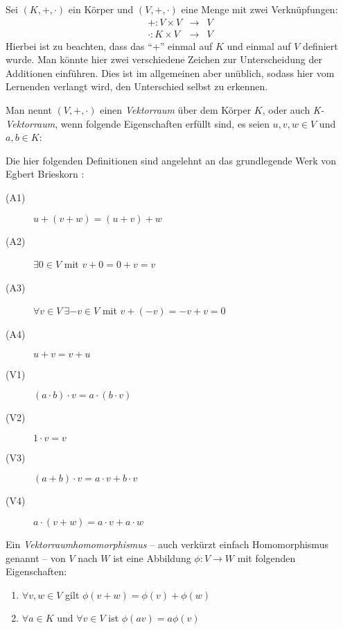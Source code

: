 Sei $(K,+,\cdot )$ ein Körper und $(V,+ ,\cdot)$ eine Menge mit zwei Verknüpfungen:
\begin{eqnarray*}
+ : V\times V &\longrightarrow& V \\
\cdot : K \times V &\longrightarrow& V 
\end{eqnarray*}
Hierbei ist zu beachten, dass das "`+"' einmal auf $K$ und einmal auf $V$ definiert wurde. Man könnte hier zwei verschiedene Zeichen zur Unterscheidung der Additionen einführen. Dies ist im allgemeinen aber unüblich, sodass hier vom Lernenden verlangt wird, den Unterschied selbst zu erkennen. 

Man nennt $(V,+ ,\cdot)$ einen \textsl{Vektorraum} über dem Körper $K$, oder auch \textsl{K-Vektorraum}, wenn folgende Eigenschaften erfüllt sind, es seien $u,v,w \in V$ und $a,b \in K$:

Die hier folgenden Definitionen sind angelehnt an das grundlegende Werk von Egbert Brieskorn \cite{Brieskorn1}:

\begin{description}
\item[(A1)] $u+(v+w) = (u+v)+w$
\item[(A2)] $\exists 0\in V$ mit $v+0=0+v=v$
\item[(A3)] $\forall v\in V \ \exists -v\in V$ mit $v+(-v) = -v+v = 0$
\item[(A4)] $u+v = v+u$
\end{description}

\begin{description}
\item[(V1)] $(a \cdot b)\cdot v = a\cdot (b\cdot v)$
\item[(V2)] $1\cdot v = v$
\item[(V3)] $(a+b)\cdot v = a\cdot v + b\cdot v$
\item[(V4)] $a\cdot(v+w) = a\cdot v + a\cdot w$
\end{description}

\begin{definition}
Ein \textsl{Vektorraumhomomorphismus} -- auch verkürzt einfach Homomorphismus genannt -- von $V$ nach $W$ ist eine Abbildung $\phi : V \longrightarrow W$ mit folgenden Eigenschaften:
\begin{enumerate}
\item $\forall v,w \in V$ gilt $\phi(v+w) = \phi(v)+\phi(w)$
\item $\forall a\in K$ und $\forall v\in V$ ist $\phi(av)=a\phi(v)$
\end{enumerate}

\end{definition}


